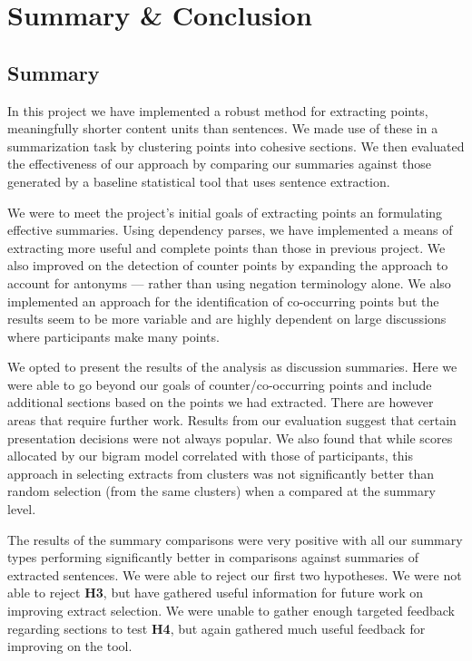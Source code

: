 \chapter{Summary \& Conclusion \label{chap:conclusion}}
  \section{Summary}
    In this project we have implemented a robust method for extracting points, meaningfully shorter content units than sentences. We made use of these in a summarization task by clustering points into cohesive sections. We then evaluated the effectiveness of our approach by comparing our summaries against those generated by a baseline statistical tool that uses sentence extraction.

    We were to meet the project's initial goals of extracting points an formulating effective summaries. Using dependency parses, we have implemented a means of extracting more useful and complete points than those in previous project. We also improved on the detection of counter points by expanding the approach to account for antonyms --- rather than using negation terminology alone. We also implemented an approach for the identification of co-occurring points but the results seem to be more variable and are highly dependent on large discussions where participants make many points.

    We opted to present the results of the analysis as discussion summaries. Here we were able to go beyond our goals of counter/co-occurring points and include additional sections based on the points we had extracted. There are however areas that require further work. Results from our evaluation suggest that certain presentation decisions were not always popular. We also found that while scores allocated by our bigram model correlated with those of participants, this approach in selecting extracts from clusters was not significantly better than random selection (from the same clusters) when a compared at the summary level.

    The results of the summary comparisons were very positive with all our summary types performing significantly better in comparisons against summaries of extracted sentences. We were able to reject our first two hypotheses. We were not able to reject \textbf{H3}, but have gathered useful information for future work on improving extract selection. We were unable to gather enough targeted feedback regarding sections to test \textbf{H4}, but again gathered much useful feedback for improving on the tool.

